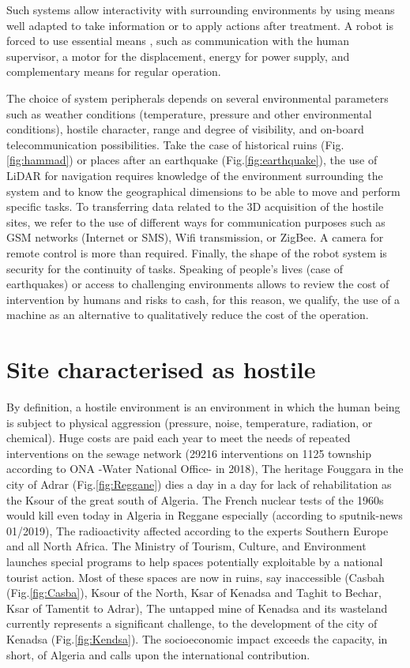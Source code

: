 \documentclass[Afour,sageh,times]{sagej}
\begin{document}
Such systems allow interactivity with surrounding environments by using means well adapted to take information or to apply actions after treatment.
A robot is forced to use essential means \citep{Okamura2004}, such as communication with the human supervisor, a motor for the displacement, energy for power supply, and complementary means for regular operation.

The choice of system peripherals depends on several environmental parameters such as weather conditions (temperature, pressure and other environmental conditions), hostile character, range and degree of visibility, and on-board telecommunication possibilities.
Take the case of historical ruins (Fig.\ref{fig:hammad}) or places after an earthquake (Fig.\ref{fig:earthquake}), the use of LiDAR for navigation requires knowledge of the environment surrounding the system and to know the geographical dimensions to be able to move and perform specific tasks.
To transferring data related to the 3D acquisition of the hostile sites, we refer to the use of different ways for communication purposes such as GSM networks (Internet or SMS), Wifi transmission, or ZigBee. A camera for remote control is more than required. Finally, the shape of the robot system is security for the continuity of tasks.
Speaking of people's lives (case of earthquakes) or access to challenging environments allows to review the cost of intervention by humans and risks to cash, for this reason, we qualify, the use of a machine as an alternative to qualitatively reduce the cost of the operation.

\section{Site characterised as hostile}
By definition, a hostile environment is an environment in which the human being is subject to physical aggression (pressure, noise, temperature, radiation, or chemical).
Huge costs are paid each year to meet the needs of repeated interventions on the sewage network (29216 interventions on 1125 township according to ONA -Water National Office- in 2018), The heritage Fouggara in the city of Adrar (Fig.\ref{fig:Reggane}) dies a day in a day for lack of rehabilitation as the Ksour of the great south of Algeria.
The French nuclear tests of the 1960s would kill even today in Algeria in Reggane especially (according to sputnik-news 01/2019), The radioactivity affected according to the experts Southern Europe and all North Africa.
The Ministry of Tourism, Culture, and Environment launches special programs to help spaces potentially exploitable by a national tourist action. Most of these spaces are now in ruins, say inaccessible (Casbah (Fig.\ref{fig:Casba}), Ksour of the North, Ksar of Kenadsa and Taghit to Bechar, Ksar of Tamentit to Adrar), The untapped mine of Kenadsa and its wasteland currently represents a significant challenge, to the development of the city of Kenadsa (Fig.\ref{fig:Kendsa}). The socioeconomic impact exceeds the capacity, in short, of Algeria and calls upon the international contribution.
\end{document}
